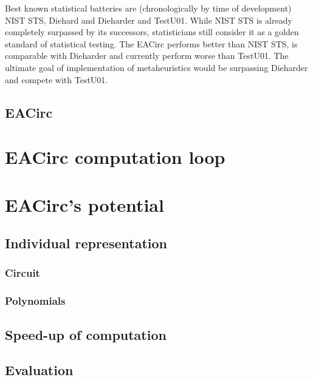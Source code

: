 \documentclass[
  print, %
  Table,   %
  nolof,     %
  nolot,     %
  11pt, %
  oneside  %
]{fithesis3}
\begin{document}
Best known statistical batteries are (chronologically by time of development) NIST STS, Diehard and Dieharder and TestU01. While NIST STS is already completely surpassed by its successors, statisticians still consider it as a golden standard of statistical testing. The EACirc performs better than NIST STS, is comparable with Dieharder and currently perform worse than TestU01. The ultimate goal of implementation of metaheuristics would be surpassing Dieharder and compete with TestU01.

\subsection{EACirc}
\label{subsec:eacirc}

\section{EACirc computation loop}
\label{sec:eac-comp}

\section{EACirc's potential}
\label{sec:eac-potential}

\subsection{Individual representation}
\label{subsec:eac-indiv-repres}

\subsubsection{\textbf{Circuit}}
\label{subsubsec:eac-indiv-repres-circuit}

\subsubsection{\textbf{Polynomials}}
\label{subsubsec:eac-indiv-repres-poly}

\subsection{Speed-up of computation}
\label{subsec:eac-speedup}

\subsection{Evaluation}
\label{subsec:eac-eval}
\end{document}
